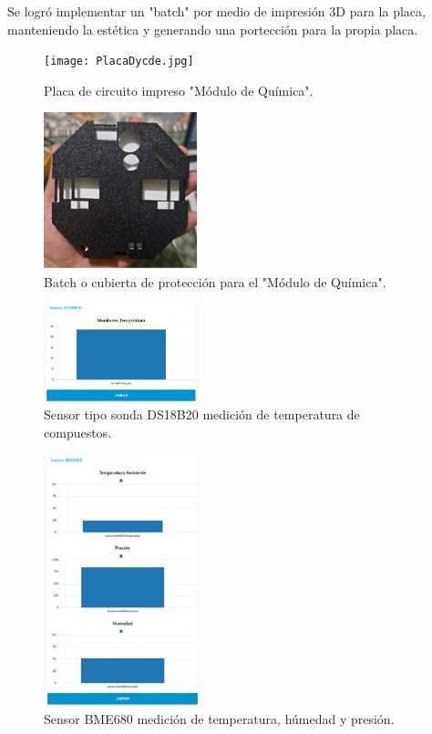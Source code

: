 \documentclass[10pt,twocolumn,letterpaper]{article}
\begin{document}
\begin{Abstract}
Se logró implementar un "batch" por medio de impresión 3D para la placa, manteniendo la estética y generando una portección para la propia placa.


\begin{figure}
  \centering
  \texttt{[image: PlacaDycde.jpg]}
  \caption{Placa de circuito impreso "Módulo de Química".}
\end{figure}

\begin{figure}
  \centering
  \includegraphics[width=0.4\textwidth]{BatchPlaca.jpg}
  \caption{Batch o cubierta de protección para el "Módulo de Química".}
\end{figure}

\begin{figure}
  \centering
  \includegraphics[width=0.4\textwidth]{DS18B20.jpg}
  \caption{Sensor tipo sonda DS18B20 medición de temperatura de compuestos.}
\end{figure}

\begin{figure}
  \centering
  \includegraphics[width=0.4\textwidth]{MedidasAmbientales.jpg}
  \caption{Sensor BME680 medición de temperatura, húmedad y presión.}
\end{figure}


\end{Abstract}
\end{document}
